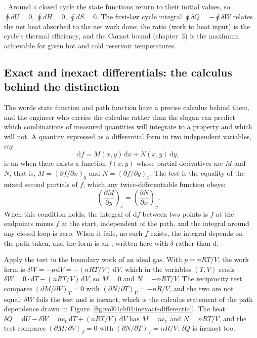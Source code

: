 . Around a closed cycle the state functions
return to their initial values, so $\oint dU = 0$, $\oint dH = 0$,
$\oint dS = 0$. The first-law cycle integral $\oint \delta Q = -\oint
\delta W$ relates the net heat absorbed to the net work done; the
ratio (work to heat input) is the cycle's thermal efficiency, and the
Carnot bound (chapter~3) is the maximum achievable for given hot and
cold reservoir temperatures.

\subsection{Exact and inexact differentials: the calculus behind the
distinction}

The words state function and path function have a precise calculus behind
them, and the engineer who carries the calculus rather than the slogan can
predict which combinations of measured quantities will integrate to a
property and which will not. A quantity expressed as a differential form in
two independent variables, say
\[
\mathrm{d}f = M(x,y)\,\mathrm{d}x + N(x,y)\,\mathrm{d}y,
\]
is an  when there exists a function $f(x,y)$
whose partial derivatives are $M$ and $N$, that is, $M = (\partial f/
\partial x)_y$ and $N = (\partial f/\partial y)_x$. The test is the equality
of the mixed second partials of $f$, which any twice-differentiable function
obeys:
\[
\left(\frac{\partial M}{\partial y}\right)_x =
\left(\frac{\partial N}{\partial x}\right)_y.
\]
When this  condition holds, the integral of
$\mathrm{d}f$ between two points is $f$ at the endpoints minus $f$ at the
start, independent of the path, and the integral around any closed loop is
zero. When it fails, no such $f$ exists, the integral depends on the path
taken, and the form is an , written here with
$\delta$ rather than $\mathrm{d}$.

Apply the test to the boundary work of an ideal gas. With $p = nRT/V$, the
work form is $\delta W = -p\,\mathrm{d}V = -(nRT/V)\,\mathrm{d}V$, which in
the variables $(T, V)$ reads $\delta W = 0 \cdot \mathrm{d}T -
(nRT/V)\,\mathrm{d}V$, so $M = 0$ and $N = -nRT/V$. The reciprocity test
compares $(\partial M/\partial V)_T = 0$ with $(\partial N/\partial T)_V =
-nR/V$, and the two are not equal: $\delta W$ fails the test and is inexact,
which is the calculus statement of the path dependence drawn in
Figure~\ref{fig:vol04ch01:inexact-differential}. The heat $\delta Q =
\mathrm{d}U - \delta W = nc_v\,\mathrm{d}T + (nRT/V)\,\mathrm{d}V$ has $M =
nc_v$ and $N = nRT/V$, and the test compares $(\partial M/\partial V)_T = 0$
with $(\partial N/\partial T)_V = nR/V$: $\delta Q$ is inexact too.

